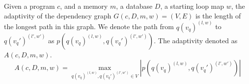 \begin{defn}
Given a program $c$, and a memory $m$, a database $D$, a starting loop map $w$, the adaptivity of the dependency graph $G(c, D,m,w) = (V, E)$ is the length of the longest path in this graph. We denote the path from $q({v_q})^{(l,w)}$ to $q({v_q}')^{(l',w')}$ as $p(q({v_q})^{(l,w)}, q({v_q}')^{(l',w')} )$. The adaptivity denoted as $A(c, D, m, w)$.
%
$$A(c, D, m, w) = \max\limits_{q({v_q})^{(l,w)},q({v_q}')^{(l',w')} \in V } |p(q({v_q})^{(l,w)}, q({v_q}')^{(l',w')} )| $$
\end{defn}





